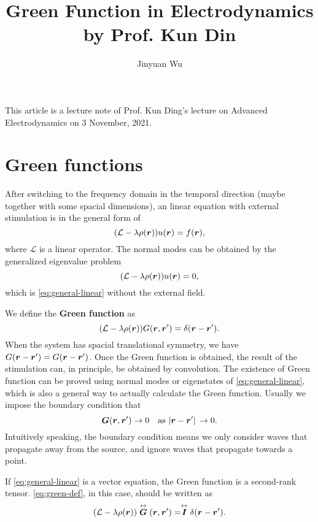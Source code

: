 \documentclass[hyperref, a4paper]{article}
\title{Green Function in Electrodynamics by Prof. Kun Din}
\author{Jinyuan Wu}
\renewcommand{\tensor}[1]{ \stackrel{\leftrightarrow}{\vb*{#1}}}
\newcommand*{\concept}[1]{{\textbf{#1}}}
\begin{document}
\maketitle

This article is a lecture note of Prof. Kun Ding's lecture on Advanced Electrodynamics on 3 November, 2021.

\section{Green functions}

After switching to the frequency domain in the temporal direction (maybe together with some spacial dimensions), 
an linear equation with external stimulation is in the general form of 
\begin{equation}
    (\mathcal{L} - \lambda \rho(\vb*{r})) u(\vb*{r}) = f(\vb*{r}),
    \label{eq:general-linear}
\end{equation}
where $\mathcal{L}$ is a linear operator. The normal modes can be obtained by the generalized eigenvalue problem
\begin{equation}
    (\mathcal{L} - \lambda \rho(\vb*{r})) u(\vb*{r}) = 0,
\end{equation}
which is \eqref{eq:general-linear} without the external field.

We define the \concept{Green function} as 
\begin{equation}
    (\mathcal{L} - \lambda \rho(\vb*{r})) G(\vb*{r}, \vb*{r}') = \delta(\vb*{r} - \vb*{r}').
    \label{eq:green-def}
\end{equation} 
When the system has spacial translational symmetry, we have $G(\vb*{r} - \vb*{r}') = G(\vb*{r} - \vb*{r}')$.
Once the Green function is obtained, the result of the stimulation can, in principle, be obtained by convolution.
The existence of Green function can be proved using normal modes or eigenstates of \eqref{eq:general-linear}, which is also a general way to actually calculate the Green function.
Usually we impose the boundary condition that 
\begin{equation}
    \vb*{G}(\vb*{r}, \vb*{r}') \to 0 \quad \text{as $\abs*{\vb*{r} - \vb*{r}'} \to 0$}.
\end{equation}
Intuitively speaking, the boundary condition means we only consider waves that propagate away from the source, and ignore waves that propagate towards a point.

If \eqref{eq:general-linear} is a vector equation, the Green function is a second-rank tensor. 
\eqref{eq:green-def}, in this case, should be written as 
\begin{equation}
    (\mathcal{L} - \lambda \rho(\vb*{r})) \tensor{G}(\vb*{r}, \vb*{r}') = \tensor{I} \delta(\vb*{r} - \vb*{r}').
\end{equation}
\end{document}
